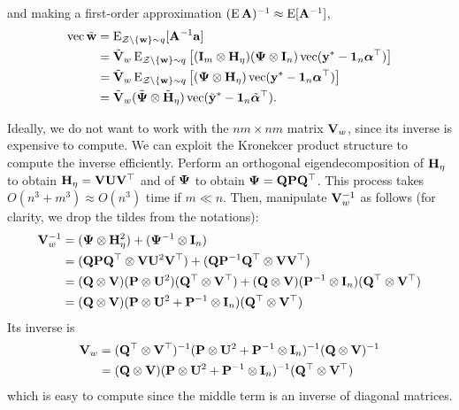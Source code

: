 and making a first-order approximation $(\operatorname{E} {\mathbf A} )^{-1} \approx \operatorname{E} [{\mathbf A}^{-1}]$,
\begin{align*}
  \operatorname{vec} \tilde{\mathbf w} 
  &= \operatorname{E}_{{\mathcal Z}\backslash\{{\mathbf w} \}\sim q} [{\mathbf A}^{-1}{\mathbf a}] \\
  &= \tilde{{\mathbf V}}_w \operatorname{E}_{{\mathcal Z}\backslash\{{\mathbf w} \}\sim q} \big[({\mathbf I}_m \otimes {\mathbf H}_\eta) ({\bm\Psi} \otimes {\mathbf I}_n) \operatorname{vec}({\mathbf y}^* - {\mathbf 1}_n{\bm\alpha}^\top)  \big] \\
  &= \tilde{{\mathbf V}}_w \operatorname{E}_{{\mathcal Z}\backslash\{{\mathbf w} \}\sim q} \big[({\bm\Psi} \otimes {\mathbf H}_\eta) \operatorname{vec}({\mathbf y}^* - {\mathbf 1}_n{\bm\alpha}^\top)  \big] \\
  &= \tilde{{\mathbf V}}_w (\tilde{{\bm\Psi}} \otimes \tilde{{\mathbf H}}_\eta) \operatorname{vec}(\tilde{{\mathbf y}}^* - {\mathbf 1}_n\tilde{{\bm\alpha}}^\top).
\end{align*}

Ideally, we do not want to work with the $nm \times nm$ matrix ${\mathbf V}_w$, since its inverse is expensive to compute.
We can exploit the Kronekcer product structure to compute the inverse efficiently.
Perform an orthogonal eigendecomposition of ${\mathbf H}_\eta$ to obtain ${\mathbf H}_\eta = {\mathbf V}{\mathbf U}{\mathbf V}^\top$ and of ${\bm\Psi}$ to obtain ${\bm\Psi} = {\mathbf Q}{\mathbf P}{\mathbf Q}^\top$.
This process takes $O(n^3 + m^3) \approx O(n^3)$ time if $m\ll n$.
Then, manipulate ${\mathbf V}_w^{-1}$ as follows (for clarity, we drop the tildes from the notations):
\begin{align*}
  {\mathbf V}_w^{-1} 
  &= ({\bm\Psi} \otimes {\mathbf H}_\eta^2) + ({\bm\Psi}^{-1} \otimes {\mathbf I}_n) \\
  &= ({\mathbf Q}{\mathbf P}{\mathbf Q}^\top \otimes {\mathbf V}{\mathbf U}^2{\mathbf V}^\top) + ({\mathbf Q}{\mathbf P}^{-1}{\mathbf Q}^\top \otimes {\mathbf V}{\mathbf V}^\top) \\
  &= ({\mathbf Q} \otimes {\mathbf V})({\mathbf P} \otimes {\mathbf U}^2)({\mathbf Q}^\top \otimes {\mathbf V}^\top) + 
  ({\mathbf Q} \otimes {\mathbf V})({\mathbf P}^{-1} \otimes {\mathbf I}_n)({\mathbf Q}^\top \otimes {\mathbf V}^\top) \\
  &= ({\mathbf Q} \otimes {\mathbf V})({\mathbf P} \otimes {\mathbf U}^2 + {\mathbf P}^{-1} \otimes {\mathbf I}_n)({\mathbf Q}^\top \otimes {\mathbf V}^\top) 
\end{align*}
Its inverse is 
\begin{align*}
  {\mathbf V}_w 
  &=  ({\mathbf Q}^\top \otimes {\mathbf V}^\top)^{-1}({\mathbf P} \otimes {\mathbf U}^2 + {\mathbf P}^{-1} \otimes {\mathbf I}_n)^{-1} ({\mathbf Q} \otimes {\mathbf V})^{-1} \\
  &= ({\mathbf Q} \otimes {\mathbf V})({\mathbf P} \otimes {\mathbf U}^2 + {\mathbf P}^{-1} \otimes {\mathbf I}_n)^{-1}({\mathbf Q}^\top \otimes {\mathbf V}^\top)
\end{align*}
which is easy to compute since the middle term is an inverse of diagonal matrices.






